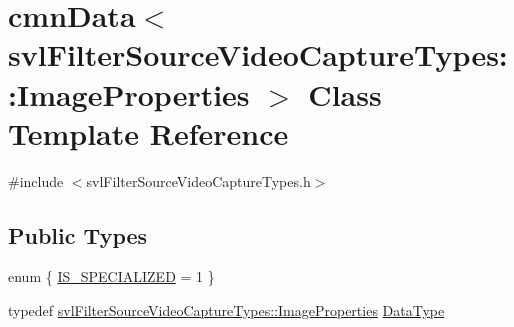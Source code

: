 \hypertarget{classcmn_data_3_01svl_filter_source_video_capture_types_1_1_image_properties_01_4}{}\section{cmn\+Data$<$ svl\+Filter\+Source\+Video\+Capture\+Types\+:\+:Image\+Properties $>$ Class Template Reference}
\label{classcmn_data_3_01svl_filter_source_video_capture_types_1_1_image_properties_01_4}


{\ttfamily \#include $<$svl\+Filter\+Source\+Video\+Capture\+Types.\+h$>$}

\subsection*{Public Types}
\begin{DoxyCompactItemize}
\item 
enum \{ \hyperlink{classcmn_data_3_01svl_filter_source_video_capture_types_1_1_image_properties_01_4_aa475b1462e96bb310fa6da5f75631336a70e556b7255e5604e78fbc82545e271b}{I\+S\+\_\+\+S\+P\+E\+C\+I\+A\+L\+I\+Z\+E\+D} = 1
 \}
\item 
typedef \hyperlink{classsvl_filter_source_video_capture_types_1_1_image_properties}{svl\+Filter\+Source\+Video\+Capture\+Types\+::\+Image\+Properties} \hyperlink{classcmn_data_3_01svl_filter_source_video_capture_types_1_1_image_properties_01_4_a5e4f9ec9d3c7fa6c707332abbc73cf39}{Data\+Type}
\end{DoxyCompactItemize}
